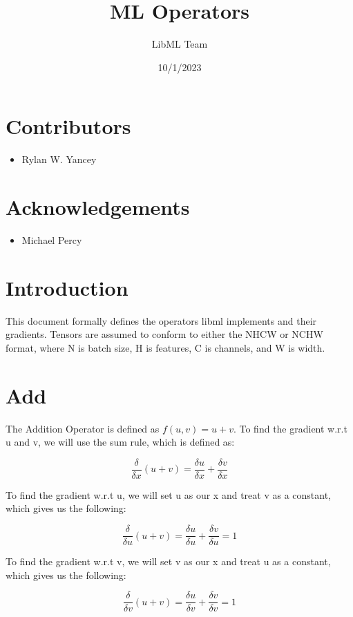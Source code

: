 \documentclass{article}
\title{ML Operators}
\author{LibML Team}
\date{10/1/2023}
\begin{document}
    \maketitle
    \section*{Contributors}
        \begin{itemize}
            \item Rylan W. Yancey
        \end{itemize}
    \section*{Acknowledgements}
        \begin{itemize}
            \item Michael Percy
        \end{itemize}
    \section*{Introduction}
        This document formally defines the operators libml implements and their gradients. Tensors are assumed to conform to either
        the NHCW or NCHW format, where N is batch size, H is features, C is channels, and W is width. 

\noindent\makebox[\linewidth]{\rule{\paperwidth}{0.4pt}}
    \section{Add}
        The Addition Operator is defined as $f(u,v) = u + v$. To find the gradient w.r.t u and v, 
        we will use the sum rule, which is defined as: 

        $$\frac{\delta}{\delta{x}}(u + v) = \frac{\delta{u}}{\delta{x}} + \frac{\delta{v}}{\delta{x}}$$

        To find the gradient w.r.t u, we will set u as our x and treat v as a constant, 
        which gives us the following:

        $$\frac{\delta}{\delta{u}}(u + v) = \frac{\delta{u}}{\delta{u}} + \frac{\delta{v}}{\delta{u}} = 1$$

        To find the gradient w.r.t v, we will set v as our x and treat u as a constant, 
        which gives us the following:

        $$\frac{\delta}{\delta{v}}(u + v) = \frac{\delta{u}}{\delta{v}} + \frac{\delta{v}}{\delta{v}} = 1$$
\end{document}
